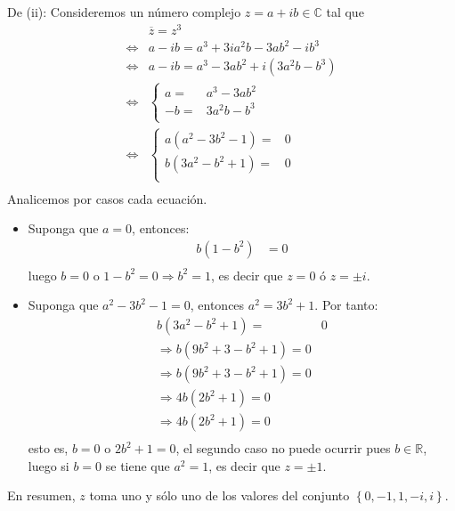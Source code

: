 \documentclass[12pt]{report}
\theoremstyle{largebreak}
\newcommand{\conj}[1]{\ensuremath{\overline{#1}}}
\begin{document}
\begin{sol}
        De (ii): Consideremos un número complejo $z=a+ib\in\mathbb{C}$ tal que
        \begin{equation*}
            \begin{split}
                &\conj{z}=z^3\\
                \iff& a-ib=a^3+3ia^2b-3ab^2-ib^3\\
                \iff& a-ib=a^3-3ab^2+i(3a^2b-b^3)\\
                \iff& \left\{
                    \begin{array}{rl}
                        a = & a^3-3ab^2\\
                        -b = & 3a^2b-b^3\\
                    \end{array}
                \right.\\
                \iff& \left\{
                    \begin{array}{rl}
                        a(a^2-3b^2-1) = & 0 \\
                        b(3a^2-b^2+1) = & 0 \\
                    \end{array}
                \right.\\
            \end{split}
        \end{equation*}
        Analicemos por casos cada ecuación.
        \begin{itemize}
            \item Suponga que $a=0$, entonces:
            \begin{equation*}
                \begin{split}
                    b(1-b^2)&=0\\
                \end{split}
            \end{equation*}
            luego $b=0$ o $1-b^2=0\Rightarrow b^2=1$, es decir que $z=0$ ó $z=\pm i$.
            \item Suponga que $a^2-3b^2-1=0$, entonces $a^2=3b^2+1$. Por tanto:
            \begin{equation*}
                \begin{split}
                    b(3a^2-b^2+1) = & 0 \\
                    \Rightarrow b(9b^2+3-b^2+1)=0\\
                    \Rightarrow b(9b^2+3-b^2+1)=0\\
                    \Rightarrow 4b(2b^2+1)=0\\
                    \Rightarrow 4b(2b^2+1)=0\\
                \end{split}
            \end{equation*}
            esto es, $b=0$ o $2b^2+1=0$, el segundo caso no puede ocurrir pues $b\in\mathbb{R}$, luego si $b=0$ se tiene que $a^2=1$, es decir que $z=\pm1$.
        \end{itemize}
        En resumen, $z$ toma uno y sólo uno de los valores del conjunto $\left\{0,-1,1,-i,i \right\}$.
    \end{sol}
\end{document}
